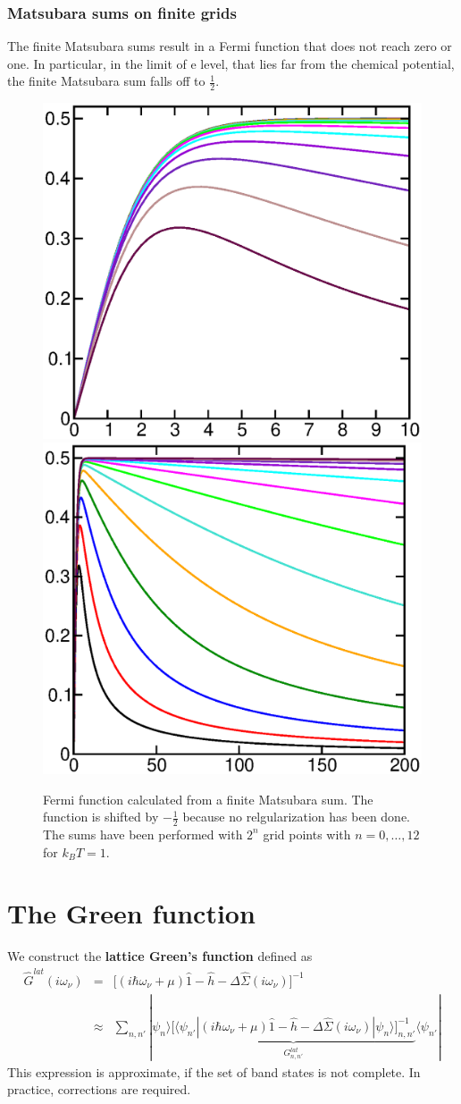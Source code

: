 \documentclass[11pt,a4paper]{report}
\begin{document}
\subsection{Matsubara sums on finite grids}
The finite Matsubara sums result in a Fermi function that does not
reach zero or one. In particular, in the limit of e level, that lies
far from the chemical potential, the finite Matsubara sum falls off to
$\frac{1}{2}$.

\begin{figure}[h!]
\begin{center}
\includegraphics[width=0.4\linewidth,clip=true]
{Figs/Xmgrace/FiniteMatsubara/gsumlow.eps}
\includegraphics[width=0.4\linewidth,clip=true]
{Figs/Xmgrace/FiniteMatsubara/gsumhigh.eps}
\end{center}
\caption{\label{fig:finfitematsubara} Fermi function calculated from a
  finite Matsubara sum. The function is shifted by $-\frac{1}{2}$
  because no relgularization has been done. The sums have been
  performed with $2^n$ grid points with $n=0,\ldots,12$ for $k_BT=1.$}
\end{figure}



\chapter{The Green function}
We construct the \textbf{lattice Green's function} defined as
\begin{eqnarray}
\hat{G}^{lat}(i\omega_\nu)&=&
\biggl[(i\hbar\omega_\nu+\mu)\hat{1}
-\hat{h}-\Delta\hat{\Sigma}(i\omega_\nu)\biggr]^{-1}
\nonumber\\
&\approx&\sum_{n,n'}|\psi_n\rangle
\underbrace{
\biggl[\langle\psi_{n'}|(i\hbar\omega_\nu+\mu)\hat{1}-\hat{h}
-\Delta\hat{\Sigma}(i\omega_\nu)|\psi_n\rangle\biggr]_{n,n'}^{-1}
}_{G^{lat}_{n,n'}}
\langle\psi_{n'}|
\label{eq:latgreenfunc}
\end{eqnarray}
This expression is approximate, if the set of band states is not
complete. In practice, corrections are required.
\end{document}
